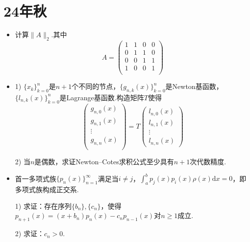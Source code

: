 
\section{24年秋}

\begin{itemize}
    
    \item[1.] 计算$\lVert A\rVert_2$.其中
    \[  A=\begin{pmatrix}
        1 & 1 & 0 &0\\
        0 & 1 & 1 &0 \\
        0 & 0 & 1 &1\\
        1 & 0 & 0 &1\\
    \end{pmatrix}\]

    \item[2.] 1) $\{x_k\}_{k=0}^{n}$是$n+1$个不同的节点，$\{g_{n,k}(x)\}_{k=0}^{n}$是Newton基函数，$\{l_{n,k}(x)\}_{k=0}^{n}$是Lagrange基函数.构造矩阵$T$使得
    \[ \begin{pmatrix}
        g_{n,0}(x)\\
        g_{n,1}(x)\\
        \vdots\\
        g_{n,n}(x)\\
    \end{pmatrix}=T\begin{pmatrix}
        l_{n,0}(x)\\
        l_{n,1}(x)\\
        \vdots\\
        l_{n,n}(x)
    \end{pmatrix}\]

    2) 当$n$是偶数，求证Newton--Cotes求积公式至少具有$n+1$次代数精度.

    \item[3.] 首一多项式族$\{p_n(x)\}_{n=1}^\infty$满足当$i\neq j$，$\int_a^b p_j(x)p_i(x)\rho(x)\mathrm{d}x=0$，即多项式族构成正交系.
    
    1) 求证：存在序列$\{b_n\},\{c_n\}$，使得$p_{n+1}(x)=(x+b_n)p_n(x)-c_np_{n-1}(x)$对$n\geq 1$成立.

    2) 求证：$c_n>0$.


\end{itemize}
